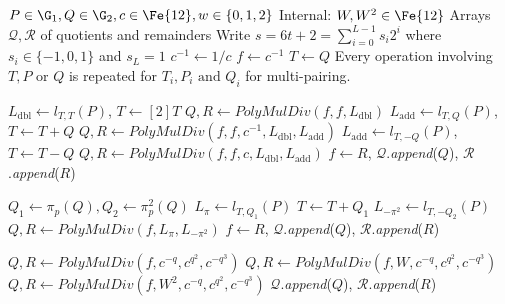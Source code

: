 \begin{algorithm}
\caption{Pairing Prover: Preparing polynomials}
\label{alg:2r:prover}
\begin{algorithmic}[1]
\Require $P \in \G_1, Q \in \G_2, c \in \Fe{12}, w \in \{0,1,2\}$
\Statex Internal: $W, W^2 \in \Fe{12}$ 
\Ensure Arrays $\mathcal{Q}, \mathcal{R}$ of quotients and remainders
\Statex Write $s = 6t + 2 = \sum_{i=0}^{L-1} s_i 2^i$ where $s_i \in \{-1, 0, 1\}$ and $s_L = 1$
\State $c^{-1} \leftarrow 1 / c$ 
\State $f \leftarrow c^{-1}$ 
\State $T \leftarrow Q$ 
\color{gray}
\Statex \small{Every operation involving $T, P \text{ or } Q$ is repeated for $T_i, P_i \text{ and } Q_i$ for multi-pairing.}
\color{black}

\Statex
\Statex {}
    \State $L_\text{dbl} \leftarrow l_{T,T}(P)$, $T \leftarrow [2]T$
		\State $Q, R \leftarrow {\textit{PolyMulDiv}}(f, f, L_\text{dbl})$ 
        \State $L_\text{add} \leftarrow l_{T,Q}(P)$, $T \leftarrow T + Q$
        \State $Q, R \leftarrow {\textit{PolyMulDiv}}(f, f, c^{-1}, L_\text{dbl}, L_\text{add})$ 
        \State $L_\text{add} \leftarrow l_{T,-Q}(P)$, $T \leftarrow T - Q$
        \State $Q, R \leftarrow {\textit{PolyMulDiv}}(f, f, c, L_\text{dbl}, L_\text{add})$ 
    \EndIf
    \State $f \leftarrow R$, $\mathcal{Q}$.\textit{append}($Q$), $\mathcal{R}$.\textit{append}($R$)
\EndFor
\Statex
\Statex {}

\State $Q_1 \leftarrow \pi_p(Q), Q_2 \leftarrow \pi_p^2(Q)$
\State $L_\pi \leftarrow l_{T,Q_1}(P)$
\State $T \leftarrow T + Q_1$
\State $L_{-\pi^2} \leftarrow l_{T,-Q_2}(P)$
\State $Q, R \leftarrow {\textit{PolyMulDiv}}(f, L_\pi, L_{-\pi^2})$ 
\State $f \leftarrow R$, $\mathcal{Q}$.\textit{append}($Q$), $\mathcal{R}$.\textit{append}($R$)

\Statex

\Statex {}

    \State $Q, R \leftarrow {\textit{PolyMulDiv}}(f, c^{-q}, c^{q^2}, c^{-q^3})$ 
    \State $Q, R \leftarrow {\textit{PolyMulDiv}}(f, W, c^{-q}, c^{q^2}, c^{-q^3})$ 
    \State $Q, R \leftarrow {\textit{PolyMulDiv}}(f, W^2, c^{-q}, c^{q^2}, c^{-q^3})$ 
\EndIf
\State $\mathcal{Q}$.\textit{append}($Q$), $\mathcal{R}$.\textit{append}($R$) 


\end{algorithmic}
\end{algorithm}
